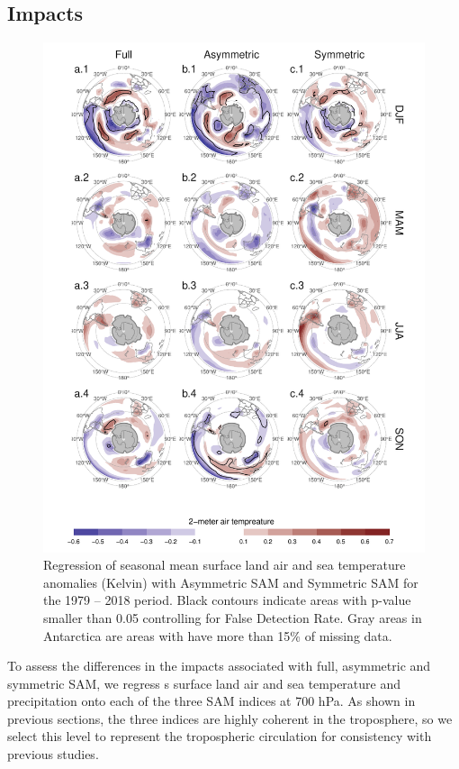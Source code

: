 \documentclass[smallextended]{svjour3}       %
\begin{document}
\hypertarget{impacts}{%
\subsection{Impacts}\label{impacts}}

\begin{figure}
\includegraphics{regr-air-season-1} \caption{Regression of seasonal mean surface land air and sea temperature anomalies (Kelvin) with Asymmetric SAM and Symmetric SAM for the 1979 -- 2018 period. Black contours indicate areas with p-value smaller than 0.05 controlling for False Detection Rate. Gray areas in Antarctica are areas with have more than 15\% of missing data.}\label{fig:regr-air-season}
\end{figure}

To assess the differences in the impacts associated with full, asymmetric and symmetric SAM, we regress s surface land air and sea temperature and precipitation onto each of the three SAM indices at 700 hPa. As shown in previous sections, the three indices are highly coherent in the troposphere, so we select this level to represent the tropospheric circulation for consistency with previous studies.
\end{document}
